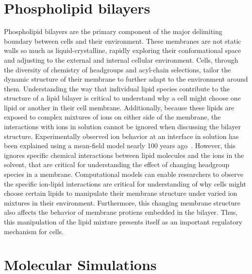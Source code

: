 \section{Phospholipid bilayers}
Phospholipid bilayers are the primary component of the major delimiting boundary between cells and their environment.
These membranes are not static walls so much as liquid-crystalline, rapidly exploring their conformational
space and adjusting to the external and internal cellular environment. Cells, through the 
diversity of chemistry of headgroups and acyl-chain selections, tailor the dynamic structure of their membrane to further
adapt to the environment around them. 
Understanding the way that individual lipid species contribute to the structure of a lipid bilayer is critical to understand
why a cell might choose one lipid or another in their cell membrane. Additionally, because these lipids are exposed to complex
mixtures of ions on either side of the membrane, the interactions with ions in solution cannot be ignored when discussing the bilayer structure. 
Experimentally observed ion behavior at an interface in solution has been explained using a mean-field model nearly 100 years ago~\cite{israelachvilli:2011:intermol}.
However, this ignores specific chemical interactions between lipid molecules and the ions in the solvent, that are critical for understanding
the effect of changing headgroup species in a membrane. 
Computational models can enable researchers to observe the specific ion-lipid interactions are critical for understanding of 
why cells might choose certain lipids to manipulate their membrane structure under varied ion mixtures in their environment. Furthermore, this 
changing membrane structure also affects the behavior of membrane protiens embedded in the bilayer. Thus, this manipulation of the lipid mixture
presents itself as an important regulatory mechanism for cells.

\section{Molecular Simulations}
